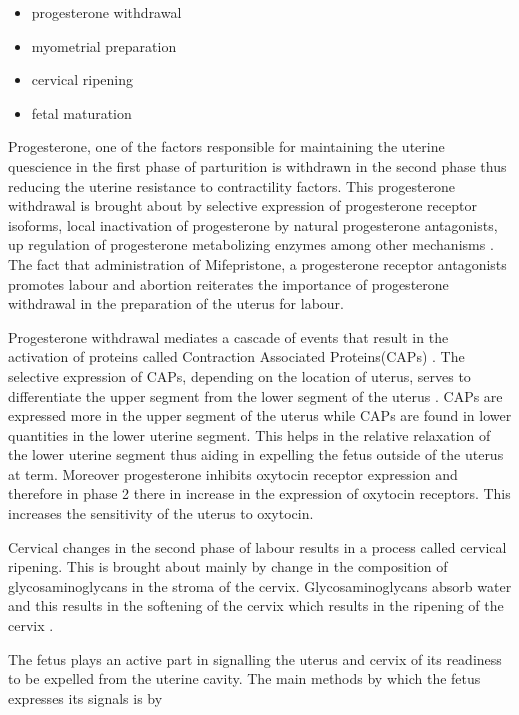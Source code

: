 \documentclass[14pt]{extarticle}
\begin{document}
\begin{itemize}
    \item progesterone withdrawal
    \item myometrial preparation
    \item cervical ripening
    \item fetal maturation
\end{itemize}

Progesterone, one of the factors responsible for maintaining the uterine quescience in the first phase of parturition is withdrawn in the second phase thus reducing the uterine resistance to contractility factors. This progesterone withdrawal is brought about by selective expression of progesterone receptor isoforms, local inactivation of progesterone by natural progesterone antagonists, up regulation of progesterone metabolizing enzymes among other mechanisms \cite{ProgesteroneWithdrawalEstrogen}. The fact that administration of Mifepristone, a progesterone receptor antagonists promotes labour and abortion reiterates the importance of progesterone withdrawal in the preparation of the uterus for labour. 

Progesterone withdrawal mediates a cascade of events that result in the activation of proteins called Contraction Associated Proteins(CAPs) \cite{nadeemMolecularEvidenceFunctional2016}. The selective expression of CAPs, depending on the location of uterus, serves to differentiate the upper segment from the lower segment of the uterus \cite{wilsonProgesteroneSignalingMyometrial2020} . CAPs are expressed more in the upper segment of the uterus while CAPs are found in lower quantities in the lower uterine segment. This helps in the relative relaxation of the lower uterine segment thus aiding in expelling the fetus outside of the uterus at term. Moreover progesterone inhibits oxytocin receptor expression and therefore in phase 2 there in increase in the expression of oxytocin receptors. This increases the sensitivity of the uterus to oxytocin.

Cervical changes in the second phase of labour results in a process called cervical ripening. This is brought about mainly by change in the composition of glycosaminoglycans in the stroma of the cervix. Glycosaminoglycans absorb water and this results in the softening of the cervix which results in the ripening of the cervix \cite{akgulHyaluronanCervicalEpithelia2014}. 

The fetus plays an active part in signalling the uterus and cervix of its readiness to be expelled from the uterine cavity. The main methods by which the fetus expresses its signals is by
\end{document}
